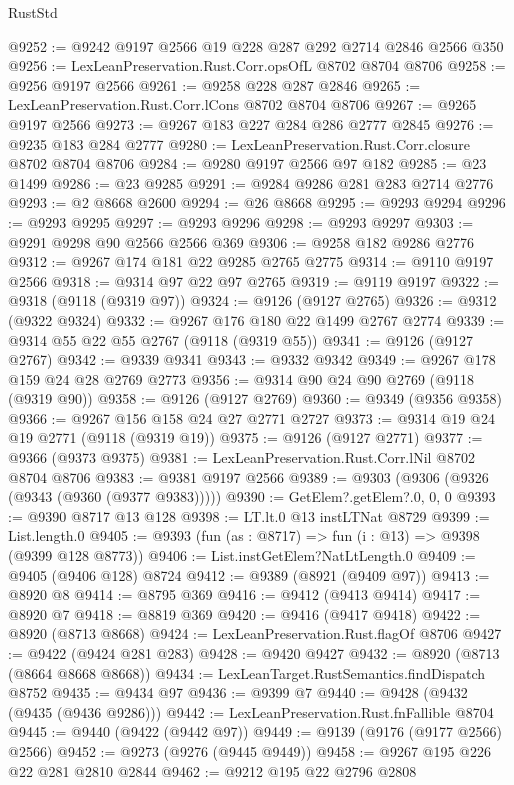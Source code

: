 \begin{lexlean}{RustStd}
\begin{coremodule}
@9252 := @9242 @9197 @2566 @19 @228 @287 @292 @2714 @2846 @2566 @350
@9256 := LexLeanPreservation.Rust.Corr.opsOfL @8702 @8704 @8706
@9258 := @9256 @9197 @2566
@9261 := @9258 @228 @287 @2846
@9265 := LexLeanPreservation.Rust.Corr.lCons @8702 @8704 @8706
@9267 := @9265 @9197 @2566
@9273 := @9267 @183 @227 @284 @286 @2777 @2845
@9276 := @9235 @183 @284 @2777
@9280 := LexLeanPreservation.Rust.Corr.closure @8702 @8704 @8706
@9284 := @9280 @9197 @2566 @97 @182
@9285 := @23 @1499
@9286 := @23 @9285
@9291 := @9284 @9286 @281 @283 @2714 @2776
@9293 := @2 @8668 @2600
@9294 := @26 @8668
@9295 := @9293 @9294
@9296 := @9293 @9295
@9297 := @9293 @9296
@9298 := @9293 @9297
@9303 := @9291 @9298 @90 @2566 @2566 @369
@9306 := @9258 @182 @9286 @2776
@9312 := @9267 @174 @181 @22 @9285 @2765 @2775
@9314 := @9110 @9197 @2566
@9318 := @9314 @97 @22 @97 @2765
@9319 := @9119 @9197
@9322 := @9318 (@9118 (@9319 @97))
@9324 := @9126 (@9127 @2765)
@9326 := @9312 (@9322 @9324)
@9332 := @9267 @176 @180 @22 @1499 @2767 @2774
@9339 := @9314 @55 @22 @55 @2767 (@9118 (@9319 @55))
@9341 := @9126 (@9127 @2767)
@9342 := @9339 @9341
@9343 := @9332 @9342
@9349 := @9267 @178 @159 @24 @28 @2769 @2773
@9356 := @9314 @90 @24 @90 @2769 (@9118 (@9319 @90))
@9358 := @9126 (@9127 @2769)
@9360 := @9349 (@9356 @9358)
@9366 := @9267 @156 @158 @24 @27 @2771 @2727
@9373 := @9314 @19 @24 @19 @2771 (@9118 (@9319 @19))
@9375 := @9126 (@9127 @2771)
@9377 := @9366 (@9373 @9375)
@9381 := LexLeanPreservation.Rust.Corr.lNil @8702 @8704 @8706
@9383 := @9381 @9197 @2566
@9389 := @9303 (@9306 (@9326 (@9343 (@9360 (@9377 @9383)))))
@9390 := GetElem?.getElem?.{0, 0, 0}
@9393 := @9390 @8717 @13 @128
@9398 := LT.lt.{0} @13 instLTNat @8729
@9399 := List.length.{0}
@9405 := @9393 (fun (as : @8717) => fun (i : @13) => @9398 (@9399 @128 @8773))
@9406 := List.instGetElem?NatLtLength.{0}
@9409 := @9405 (@9406 @128) @8724
@9412 := @9389 (@8921 (@9409 @97))
@9413 := @8920 @8
@9414 := @8795 @369
@9416 := @9412 (@9413 @9414)
@9417 := @8920 @7
@9418 := @8819 @369
@9420 := @9416 (@9417 @9418)
@9422 := @8920 (@8713 @8668)
@9424 := LexLeanPreservation.Rust.flagOf @8706
@9427 := @9422 (@9424 @281 @283)
@9428 := @9420 @9427
@9432 := @8920 (@8713 (@8664 @8668 @8668))
@9434 := LexLeanTarget.RustSemantics.findDispatch @8752
@9435 := @9434 @97
@9436 := @9399 @7
@9440 := @9428 (@9432 (@9435 (@9436 @9286)))
@9442 := LexLeanPreservation.Rust.fnFallible @8704
@9445 := @9440 (@9422 (@9442 @97))
@9449 := @9139 (@9176 (@9177 @2566) @2566)
@9452 := @9273 (@9276 (@9445 @9449))
@9458 := @9267 @195 @226 @22 @281 @2810 @2844
@9462 := @9212 @195 @22 @2796 @2808

\end{coremodule}
\end{lexlean}
